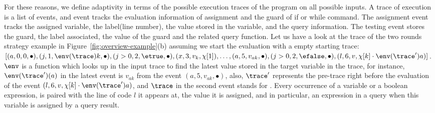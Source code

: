 For these reasons, we define adaptivity in terms of the possible execution traces of the program on all possible inputs. 
A trace of execution is a list of events, 
and event tracks the evaluation information of assignment and the guard of if or while command.
The assignment event tracks the assigned variable, the label(line number), the value stored in the variable, and the query information. The testing event stores the guard, the label associated, the value of the guard and the related query function. Let us have a look at the trace of the two rounds strategy example in Figure~\ref{fig:overview-example}(b) assuming we start the evaluation with a empty starting trace:  
$
[(a, 0, 0, \bullet), (j, 1, \env(\trace)k , \bullet), (j > 0, 2, \etrue, \bullet), 
(x, 3, v_k, \chi[1]), \ldots, (a, 5, v_{ak}, \bullet), (j > 0, 2, \efalse, \bullet), (l, 6, v, \chi[k] \cdot \env(\trace')a) ]$. 
$\env$ is a function which looks up in the input trace to find the latest value stored in the target variable in the trace, 
for instance, $\env(\trace')(a) $ in the latest event is $v_{ak}$ from the event $(a, 5, v_{ak}, \bullet)$,
also, $\trace'$ represents the pre-trace right before the evaluation of the event $(l, 6, v, \chi[k] \cdot \env(\trace')a)$, and $\trace$ in the second event stands for . 
 Every occurrence of a variable or a boolean expression,
is paired with the line of code $l$ it appears at,
the value it is assigned, 
and in particular, an expression in a query when this variable is assigned by a query result. 
